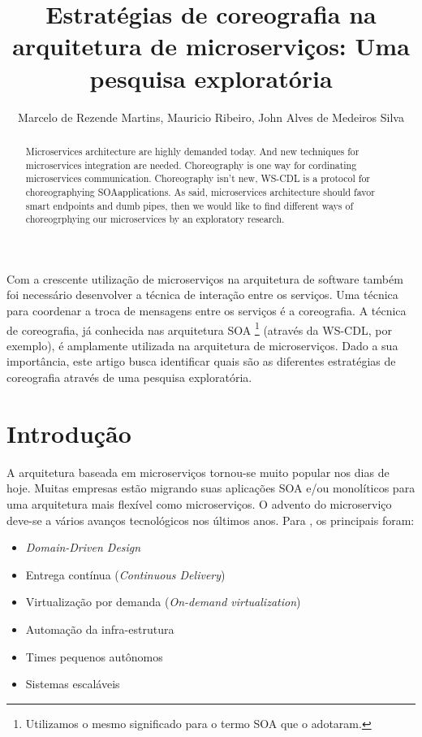 \documentclass[12pt]{article}
\title{Estratégias de coreografia na arquitetura de microserviços: Uma pesquisa exploratória}
\author{Marcelo de Rezende Martins\inst{1}, Mauricio Ribeiro\inst{1}, John Alves de Medeiros Silva\inst{1} }
\theoremstyle{plain}
\begin{document}
 

\maketitle

\begin{abstract}
    Microservices architecture are highly demanded today. And new techniques for microservices integration are needed. Choreography is one way for cordinating microservices communication. Choreography isn't new, 
    WS-CDL is a protocol for choreographying SOA\footnotemark[1] applications. As \cite{martinfowler-microservices:2014} said, microservices architecture should favor smart endpoints and dumb pipes, then we would like to find different ways of choreogrphying our microservices by an exploratory research.
\end{abstract}
     
\begin{resumo} 
  Com a crescente utilização de microserviços na arquitetura de software também foi necessário desenvolver a técnica de interação entre os serviços. Uma técnica para coordenar a troca de mensagens entre os serviços é a coreografia. A técnica de coreografia, já conhecida nas arquitetura SOA \footnote{Utilizamos o mesmo significado para o termo SOA que o \cite{martinfowler-microservices:2014} adotaram.} (através da WS-CDL, por exemplo), é amplamente utilizada na arquitetura de microserviços. Dado a sua importância, este artigo busca identificar quais são as diferentes estratégias de coreografia através de uma pesquisa exploratória. 
\end{resumo}


\section{Introdução}
\label{sec:introducao}

A arquitetura baseada em microserviços tornou-se muito popular nos dias de hoje. Muitas empresas estão migrando suas aplicações SOA \footnotemark[1] e/ou monolíticos para uma arquitetura mais flexível como microserviços. O advento do microserviço deve-se a vários avanços tecnológicos nos últimos anos. Para \cite{Newman:15}, os principais foram:
\begin{itemize}
    \item \textit{Domain-Driven Design}
    \item Entrega contínua (\textit{Continuous Delivery})
    \item Virtualização por demanda (\textit{On-demand virtualization})
    \item Automação da infra-estrutura
    \item Times pequenos autônomos
    \item Sistemas escaláveis
\end{itemize}
\end{document}
